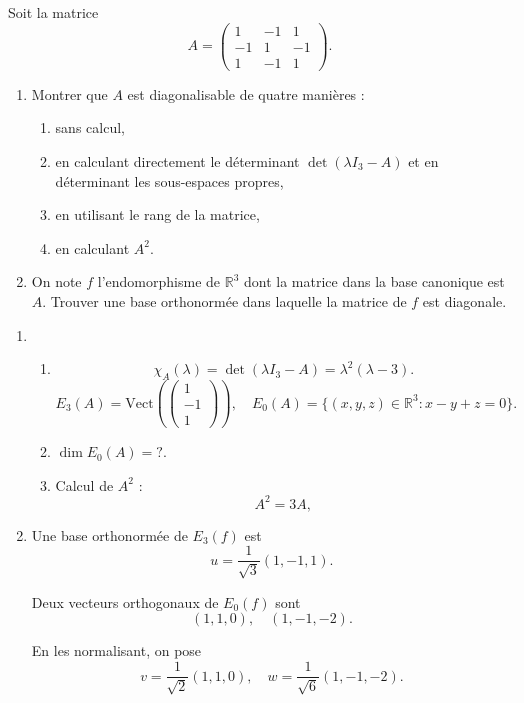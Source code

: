 \documentclass[a4paper,12pt,oneside]{book}
\newenvironment{statement}{\begin{statementbox}}{\end{statementbox}}
\newenvironment{solution}{\begin{solutionbox}}{\end{solutionbox}}
\begin{document}
\begin{statement}
	Soit la matrice 
	\[
	A = \begin{pmatrix}
		1 & -1 & 1 \\
		-1 & 1 & -1 \\
		1 & -1 & 1
	\end{pmatrix}.
	\]
	\begin{enumerate}
		\item Montrer que \(A\) est diagonalisable de quatre manières :
		\begin{enumerate}
			\item sans calcul,
			\item en calculant directement le déterminant \(\det(\lambda I_3 - A)\) et en déterminant les sous-espaces propres,
			\item en utilisant le rang de la matrice,
			\item en calculant \(A^2\).
		\end{enumerate}
		\item On note \(f\) l’endomorphisme de \(\mathbb{R}^3\) dont la matrice dans la base canonique est \(A\).
		Trouver une base orthonormée dans laquelle la matrice de \(f\) est diagonale.
	\end{enumerate}
\end{statement}

\begin{solution}
	\begin{enumerate}
		\item 
		\begin{enumerate}
			\item 
			\[
			\chi_A(\lambda) = \det(\lambda I_3 - A) = \lambda^2 (\lambda - 3).
			\]
			\[
			E_3(A) = \mathrm{Vect}\left(\begin{pmatrix}1 \\ -1 \\ 1\end{pmatrix}\right), \quad E_0(A) = \{(x,y,z) \in \mathbb{R}^3 : x - y + z = 0\}.
			\]
		
			\item \(\dim E_0(A) = ?\).
			
			\item Calcul de \(A^2\) :
			\[
			A^2 = 3A,
			\]
			
		\end{enumerate}
		
		\item Une base orthonormée de \(E_3(f)\) est 
		\[
		u = \frac{1}{\sqrt{3}}(1,-1,1).
		\]
		
		Deux vecteurs orthogonaux de \(E_0(f)\) sont 
		\[
		(1,1,0), \quad (1,-1,-2).
		\]
		
		En les normalisant, on pose 
		\[
		v = \frac{1}{\sqrt{2}}(1,1,0), \quad w = \frac{1}{\sqrt{6}}(1,-1,-2).
		\]
		
		
	\end{enumerate}
\end{solution}
\end{document}
